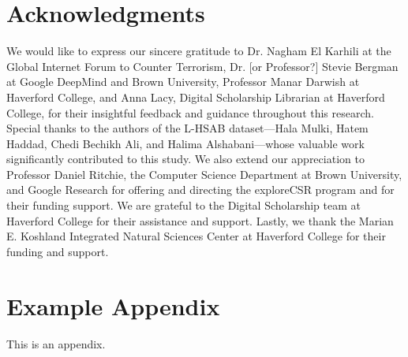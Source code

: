 \documentclass[11pt]{article}
\begin{document}
\section*{Acknowledgments}

We would like to express our sincere gratitude to Dr. Nagham El Karhili at the Global Internet Forum to Counter Terrorism, Dr. [or Professor?] Stevie Bergman at Google DeepMind and Brown University, Professor Manar Darwish at Haverford College, and Anna Lacy, Digital Scholarship Librarian at Haverford College, for their insightful feedback and guidance throughout this research. Special thanks to the authors of the L-HSAB dataset—Hala Mulki, Hatem Haddad, Chedi Bechikh Ali, and Halima Alshabani—whose valuable work significantly contributed to this study. We also extend our appreciation to Professor Daniel Ritchie, the Computer Science Department at Brown University, and Google Research for offering and directing the exploreCSR program and for their funding support. We are grateful to the Digital Scholarship team at Haverford College for their assistance and support. Lastly, we thank the Marian E. Koshland Integrated Natural Sciences Center at Haverford College for their funding and support.



%


\appendix

\section{Example Appendix}
\label{sec:appendix}

This is an appendix.
\end{document}
